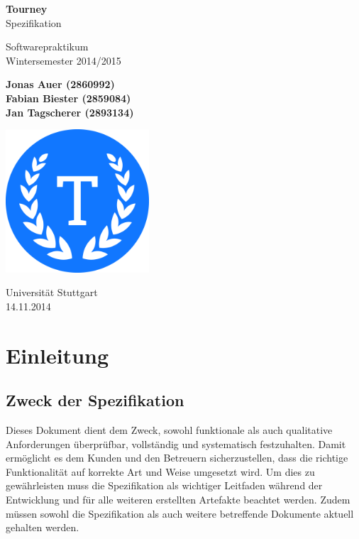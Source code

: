 \documentclass[11pt]{article}
\begin{document}
\begin{titlepage}
	\begin{center}
		\vspace*{1cm}

		\Huge
		\textbf{Tourney}\\
		Spezifikation

		\vspace{0.5cm}
		\LARGE
		Softwarepraktikum\\
		\Large
		Wintersemester 2014/2015

		\vspace{1.5cm}

		\large
		\textbf{Jonas Auer (2860992)\\
				 Fabian Biester (2859084)\\
				 Jan Tagscherer (2893134)}

		\vfill

		\includegraphics[width=0.4\textwidth]{Logo.png}

		\vspace{1.5cm}

		\Large
		Universität Stuttgart\\
		14.11.2014
	\end{center}
\end{titlepage}

\newpage

\tableofcontents
\newpage

\section{Einleitung}

\subsection{Zweck der Spezifikation}

Dieses Dokument dient dem Zweck, sowohl funktionale als auch qualitative Anforderungen überprüfbar, vollständig und systematisch festzuhalten. Damit ermöglicht es dem Kunden und den Betreuern sicherzustellen, dass die richtige Funktionalität auf korrekte Art und Weise umgesetzt wird. Um dies zu gewährleisten muss die Spezifikation als wichtiger Leitfaden während der Entwicklung und für alle weiteren erstellten Artefakte beachtet werden. Zudem müssen sowohl die Spezifikation als auch weitere betreffende Dokumente aktuell gehalten werden.
\end{document}
